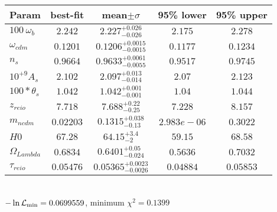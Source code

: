 \begin{tabular}{|l|c|c|c|c|} 
 \hline 
Param & best-fit & mean$\pm\sigma$ & 95\% lower & 95\% upper \\ \hline 
$100~\omega{}_{b }$ &$2.242$ & $2.227_{-0.026}^{+0.026}$ & $2.175$ & $2.278$ \\ 
$\omega{}_{cdm }$ &$0.1201$ & $0.1206_{-0.0015}^{+0.0015}$ & $0.1177$ & $0.1234$ \\ 
$n_{s }$ &$0.9664$ & $0.9633_{-0.0055}^{+0.0061}$ & $0.9517$ & $0.9745$ \\ 
$10^{+9}A_{s }$ &$2.102$ & $2.097_{-0.014}^{+0.013}$ & $2.07$ & $2.123$ \\ 
$100*\theta{}_{s }$ &$1.042$ & $1.042_{-0.001}^{+0.001}$ & $1.04$ & $1.044$ \\ 
$z_{reio }$ &$7.718$ & $7.688_{-0.25}^{+0.22}$ & $7.228$ & $8.157$ \\ 
$m_{ncdm }$ &$0.02203$ & $0.1315_{-0.13}^{+0.038}$ & $2.983e-06$ & $0.3022$ \\ 
$H0$ &$67.28$ & $64.15_{-2}^{+3.4}$ & $59.15$ & $68.58$ \\ 
$\Omega{}_{Lambda }$ &$0.6834$ & $0.6401_{-0.024}^{+0.05}$ & $0.5636$ & $0.7032$ \\ 
$\tau{}_{reio }$ &$0.05476$ & $0.05365_{-0.0026}^{+0.0023}$ & $0.04884$ & $0.05853$ \\ 
\hline 
 \end{tabular} \\ 
$-\ln{\cal L}_\mathrm{min} =0.0699559$, minimum $\chi^2=0.1399$ \\ 
